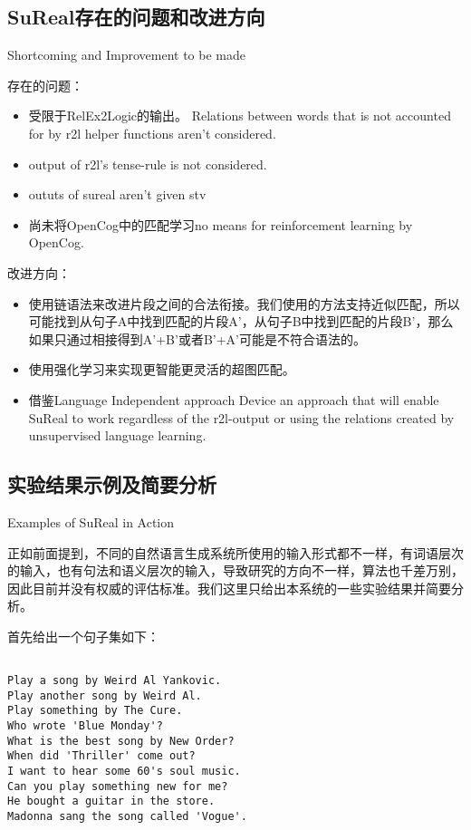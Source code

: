 \subsection{SuReal存在的问题和改进方向}{Shortcoming and Improvement to be made}

存在的问题：

\begin{itemize}
\item 受限于RelEx2Logic的输出。
Relations between words that is not accounted for by r2l helper functions aren't considered.
\item output of r2l's tense-rule is not considered.
\item oututs of sureal aren't given stv
\item 尚未将OpenCog中的匹配学习no means for reinforcement learning by OpenCog.
\end{itemize}

改进方向：

\begin{itemize}
\item 使用链语法来改进片段之间的合法衔接。我们使用的方法支持近似匹配，所以可能找到从句子A中找到匹配的片段A'，从句子B中找到匹配的片段B'，那么如果只通过相接得到A'+B'或者B'+A'可能是不符合语法的。 
\item 使用强化学习来实现更智能更灵活的超图匹配。
\item 借鉴Language Independent approach
Device an approach that will enable SuReal to work regardless of the r2l-output or using the relations created by unsupervised language learning.
\end{itemize}


\subsection{实验结果示例及简要分析}{Examples of SuReal in Action}


正如前面提到，不同的自然语言生成系统所使用的输入形式都不一样，有词语层次的输入，也有句法和语义层次的输入，导致研究的方向不一样，算法也千差万别，因此目前并没有权威的评估标准。我们这里只给出本系统的一些实验结果并简要分析。

首先给出一个句子集如下：

\begin{verbatim}

Play a song by Weird Al Yankovic.
Play another song by Weird Al.
Play something by The Cure.
Who wrote 'Blue Monday'?
What is the best song by New Order?
When did 'Thriller' come out?
I want to hear some 60's soul music.
Can you play something new for me?
He bought a guitar in the store.
Madonna sang the song called 'Vogue'.

\end{verbatim}

